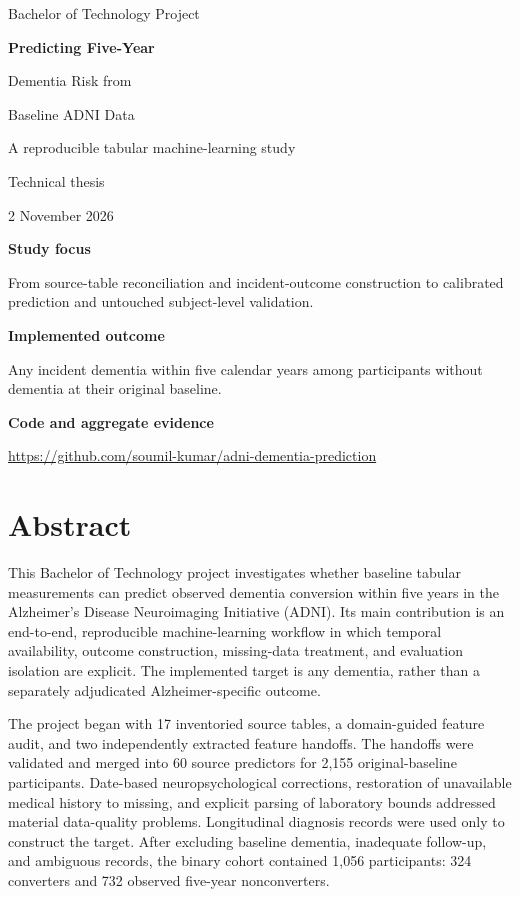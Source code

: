 \documentclass[11pt,a4paper]{article}
\begin{document}
\begin{titlepage}\centering\vspace*{25mm}
{\Large Bachelor of Technology Project\par}\vspace{17mm}
{\Huge\bfseries Predicting Five-Year\par Dementia Risk from\par Baseline ADNI Data\par}\vspace{12mm}
{\Large A reproducible tabular machine-learning study\par}\vspace{16mm}
{\large Technical thesis\par 2 November 2026\par}\vfill
\begin{minipage}{.87\textwidth}
\textbf{Study focus}\par
From source-table reconciliation and incident-outcome construction to calibrated prediction and untouched subject-level validation.

\textbf{Implemented outcome}\par
Any incident dementia within five calendar years among participants without dementia at their original baseline.

\textbf{Code and aggregate evidence}\par
\url{https://github.com/soumil-kumar/adni-dementia-prediction}
\end{minipage}\vspace{12mm}
\end{titlepage}\setcounter{page}{2}
\section*{Abstract}
This Bachelor of Technology project investigates whether baseline tabular measurements can predict observed dementia conversion within five years in the Alzheimer's Disease Neuroimaging Initiative (ADNI). Its main contribution is an end-to-end, reproducible machine-learning workflow in which temporal availability, outcome construction, missing-data treatment, and evaluation isolation are explicit. The implemented target is any dementia, rather than a separately adjudicated Alzheimer-specific outcome.

The project began with 17 inventoried source tables, a domain-guided feature audit, and two independently extracted feature handoffs. The handoffs were validated and merged into 60 source predictors for 2,155 original-baseline participants. Date-based neuropsychological corrections, restoration of unavailable medical history to missing, and explicit parsing of laboratory bounds addressed material data-quality problems. Longitudinal diagnosis records were used only to construct the target. After excluding baseline dementia, inadequate follow-up, and ambiguous records, the binary cohort contained 1,056 participants: 324 converters and 732 observed five-year nonconverters.
\end{document}
